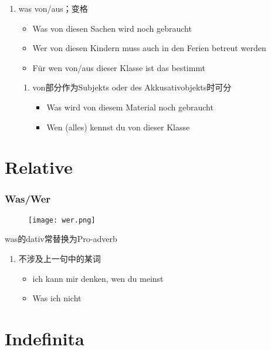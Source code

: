 \documentclass[UTF8]{report}
\begin{document}
\begin{enumerate}
\begin{itemize}
    \end{itemize}
    \item was von/aus；变格
    \begin{itemize}
        \item Was von diesen Sachen wird noch gebraucht
        \item Wer von diesen Kindern muss auch in den Ferien betreut werden
        \item Für wen von/aus dieser Klasse ist das bestimmt
    \end{itemize}
    \begin{enumerate}
        \item von部分作为Subjekts oder des Akkusativobjekts时可分
        \begin{itemize}
            \item Was wird von diesem Material noch gebraucht
            \item Wen (alles) kennst du von dieser Klasse
        \end{itemize}
    \end{enumerate}
\end{enumerate}

\section{Relative}
\subsubsection{Was/Wer}
\begin{figure}[H]
    \centering
    \texttt{[image: wer.png]}
\end{figure}
was的dativ常替换为Pro-adverb
\begin{enumerate}
    \item 不涉及上一句中的某词
    \begin{itemize}
        \item ich kann mir denken, wen du meinst
        \item Was ich nicht 
    \end{itemize}
\end{enumerate}


\section{Indefinita}
\end{document}

